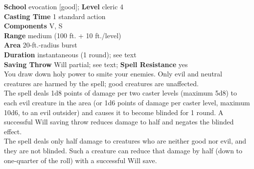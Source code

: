 \textbf{School} evocation [good]; \textbf{Level} cleric 4\\
\textbf{Casting Time} 1 standard action\\
\textbf{Components} V, S\\
\textbf{Range }medium (100 ft. + 10 ft./level)\\
\textbf{Area} 20-ft.-radius burst\\
\textbf{Duration} instantaneous (1 round); see text\\
\textbf{Saving Throw }Will partial; see text; \textbf{Spell Resistance} yes\\
You draw down holy power to smite your enemies. Only evil and neutral creatures are harmed by the spell; good creatures are unaffected.\\
The spell deals 1d8 points of damage per two caster levels (maximum 5d8) to each evil creature in the area (or 1d6 points of damage per caster level, maximum 10d6, to an evil outsider) and causes it to become blinded for 1 round. A successful Will saving throw reduces damage to half and negates the blinded effect.\\
The spell deals only half damage to creatures who are neither good nor evil, and they are not blinded. Such a creature can reduce that damage by half (down to one-quarter of the roll) with a successful Will save.\\
